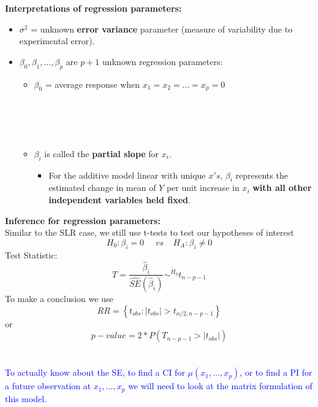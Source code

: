 \Large\textbf{Interpretations of regression parameters:}\large
\begin{itemize}
\item $\sigma^2$ = unknown \textbf{error variance} parameter (measure of variability due to experimental error). 
\item $\beta_0, \beta_1, \ldots, \beta_p$ are $p+1$ unknown regression parameters:
	\begin{itemize}
	\item $\beta_0$ = average response when $x_1 = x_2 = \ldots = x_p =0$\\~\\~\\~\\~\\
	\item $\beta_i$ is called the \textbf{partial slope} for $x_i$. 
	\begin{itemize}
	\item For the additive model linear with unique $x's$, $\beta_i$ represents the estimated change in mean of $Y$ per unit increase in $x_i$ \textbf{with all other independent variables held fixed}. 
\end{itemize}
\end{itemize}
\end{itemize}

\newpage

\Large\textbf{Inference for regression parameters:}\large\\
Similar to the SLR case, we still use t-tests to test our hypotheses of interest
$$H_0:\beta_i=0~~~~~~vs~~~~~H_A:\beta_i\neq 0$$
Test Statistic:
$$T=\frac{\hat{\beta}_i}{\hat{SE}(\hat{\beta}_i)}\sim^{H_0} t_{n-p-1}$$
To make a conclusion we use
$$RR=\left\{t_{obs}:|t_{obs}|>t_{\alpha/2,n-p-1}\right\}$$
or
$$p-value=2*P(T_{n-p-1}>|t_{obs}|)$$~\\~\\

\textcolor{blue}{To actually know about the SE, to find a CI for $\mu(x_1,...,x_p)$, or to find a PI for a future observation at $x_1,...,x_p$ we will need to look at the matrix formulation of this model.}

\newpage

